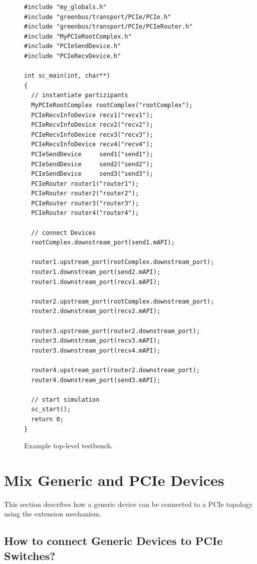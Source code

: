 \begin{figure}[htbp]
  \begin{lstlisting}
#include "my_globals.h"
#include "greenbus/transport/PCIe/PCIe.h"
#include "greenbus/transport/PCIe/PCIeRouter.h"
#include "MyPCIeRootComplex.h"
#include "PCIeSendDevice.h"
#include "PCIeRecvDevice.h"
                              
int sc_main(int, char**)
{
  // instantiate partizipants
  MyPCIeRootComplex rootComplex("rootComplex");
  PCIeRecvInfoDevice recv1("recv1");
  PCIeRecvInfoDevice recv2("recv2");
  PCIeRecvInfoDevice recv3("recv3");
  PCIeRecvInfoDevice recv4("recv4");
  PCIeSendDevice     send1("send1");
  PCIeSendDevice     send2("send2");
  PCIeSendDevice     send3("send3");
  PCIeRouter router1("router1");
  PCIeRouter router2("router2");
  PCIeRouter router3("router3");
  PCIeRouter router4("router4");

  // connect Devices
  rootComplex.downstream_port(send1.mAPI);

  router1.upstream_port(rootComplex.downstream_port);
  router1.downstream_port(send2.mAPI);
  router1.downstream_port(recv1.mAPI);

  router2.upstream_port(rootComplex.downstream_port);
  router2.downstream_port(recv2.mAPI);

  router3.upstream_port(router2.downstream_port);
  router3.downstream_port(recv3.mAPI);
  router3.downstream_port(recv4.mAPI);

  router4.upstream_port(router2.downstream_port);
  router4.downstream_port(send3.mAPI);

  // start simulation
  sc_start();
  return 0;
} 
  \end{lstlisting}
  \caption{Example top-level testbench.}
  \label{fig:lstExampleTopology}
\end{figure}

\section{Mix Generic and PCIe Devices}
\label{sec:MixGenericAndPCIeDevices}

This section describes how a generic device can be connected to a PCIe topology using the extension mechanism.

\subsection{How to connect Generic Devices to PCIe Switches?}
\label{sec:HowConnGenDev2PCIeRouter}

